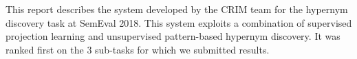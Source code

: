 This report describes the system developed by the CRIM team for the hypernym discovery task at SemEval 2018. This system exploits a combination of supervised projection learning and unsupervised pattern-based hypernym discovery. It was ranked first on the 3 sub-tasks for which we submitted results.
